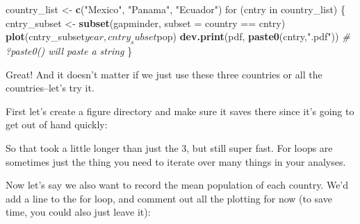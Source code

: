 \documentclass[]{book}
\newenvironment{Shaded}{\begin{snugshade}}{\end{snugshade}}
\newcommand{\KeywordTok}[1]{\textcolor[rgb]{0.13,0.29,0.53}{\textbf{{#1}}}}
\newcommand{\DataTypeTok}[1]{\textcolor[rgb]{0.13,0.29,0.53}{{#1}}}
\newcommand{\StringTok}[1]{\textcolor[rgb]{0.31,0.60,0.02}{{#1}}}
\newcommand{\CommentTok}[1]{\textcolor[rgb]{0.56,0.35,0.01}{\textit{{#1}}}}
\newcommand{\NormalTok}[1]{{#1}}
\theoremstyle{definition}
\theoremstyle{definition}
\theoremstyle{definition}
\theoremstyle{remark}
\begin{document}
\begin{Shaded}
\begin{Highlighting}[]
\NormalTok{country_list <-}\StringTok{ }\KeywordTok{c}\NormalTok{(}\StringTok{"Mexico"}\NormalTok{, }\StringTok{"Panama"}\NormalTok{, }\StringTok{"Ecuador"}\NormalTok{) }
\NormalTok{for (cntry in country_list) \{}
  \NormalTok{cntry_subset <-}\StringTok{ }\KeywordTok{subset}\NormalTok{(gapminder, }\DataTypeTok{subset =} \NormalTok{country ==}\StringTok{ }\NormalTok{cntry) }
  \KeywordTok{plot}\NormalTok{(cntry_subset$year, cntry_subset$pop)}
  \KeywordTok{dev.print}\NormalTok{(pdf, }\KeywordTok{paste0}\NormalTok{(cntry,}\StringTok{".pdf"}\NormalTok{)) }\CommentTok{# ?paste0() will paste a string}
\NormalTok{\} }
\end{Highlighting}
\end{Shaded}

Great! And it doesn't matter if we just use these three countries or all
the countries--let's try it.

First let's create a figure directory and make sure it saves there since
it's going to get out of hand quickly:

\begin{Shaded}
\end{Shaded}

So that took a little longer than just the 3, but still super fast. For
loops are sometimes just the thing you need to iterate over many things
in your analyses.

Now let's say we also want to record the mean population of each
country. We'd add a line to the for loop, and comment out all the
plotting for now (to save time, you could also just leave it):
\end{document}
